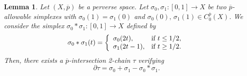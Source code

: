 \documentclass[a4paper,10pt,english,reqno]{amsart}
\theoremstyle{plain}
\newtheorem{lemma}[proposition]{Lemma}
\theoremstyle{definition}
\theoremstyle{remark}
\numberwithin{equation}{section}
\def\ov{\overline}
\renewcommand\1{\hbox{\ding{192}}}
\renewcommand\2{\hbox{\ding{193}}}
\newcommand\3{\hbox{\ding{194}}}
\newcommand\4{\hbox{\ding{195}}}
\begin{document}
\begin{lemma}\label{*tau}
%
Let $(X,\ov p)$ be a perverse space.  
Let $\sigma_0, \sigma_1 \colon[0,1] \to X$ be two $\ov p$-allowable simplexes  with $\sigma_0(1) = \sigma_1(0)$
and $\sigma_{0}(0),\,\sigma_{1}(1)\in C_0^{\ov p}(X)$. 
We consider the simplex  $\sigma_0 * \sigma_1 \colon [0,1] \to X$ defined by 
 $$
    \sigma_0 * \sigma_1(t) = \left\{
    \begin{array}{ll}
    \sigma_0(2t) ,& \hbox{if } t\leq 1/2,\\
      \sigma_1(2t-1) ,& \hbox{if } t\geq 1/2.
      \end{array}
      \right.
      $$
Then, 
there exists a $\ov p$-intersection 2-chain  $\tau$ verifying 
\begin{equation}\label{sigma*}
\partial \tau =     \sigma_0 + \sigma_1 - \sigma_0*\sigma_1.
\end{equation}
\end{lemma}
\end{document}
